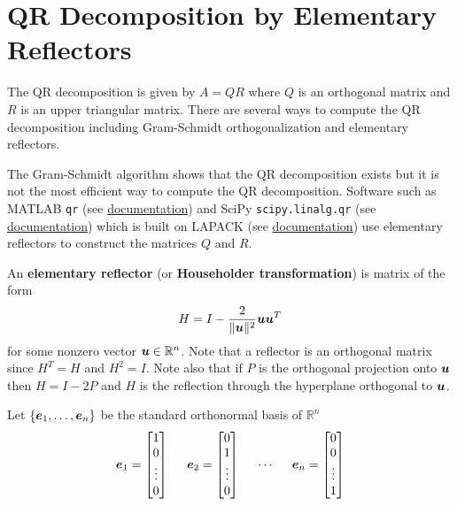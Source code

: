 \section{QR Decomposition by Elementary Reflectors}

\begin{bigidea}
The QR decomposition is given by $A = QR$ where $Q$ is an orthogonal matrix and $R$ is an upper triangular matrix. There are several ways to compute the QR decomposition including Gram-Schmidt orthogonalization and elementary reflectors.
\end{bigidea}

\begin{note}
The Gram-Schmidt algorithm shows that the QR decomposition exists but it is not the most efficient way to compute the QR decomposition. Software such as MATLAB {\tt qr} (see \href{https://www.mathworks.com/help/matlab/ref/qr.html}{documentation}) and SciPy {\tt scipy.linalg.qr} (see \href{https://docs.scipy.org/doc/scipy/reference/generated/scipy.linalg.qr.html}{documentation}) which is built on LAPACK (see \href{https://www.netlib.org/lapack/lug/node128.html#secorthog}{documentation}) use elementary reflectors to construct the matrices $Q$ and $R$.
\end{note}

\begin{definition}
An {\bf elementary reflector} (or {\bf Householder transformation}) \cite[p.120]{MH} is matrix of the form
$$
H = I - \frac{2}{\| \boldsymbol{u} \|^2} \boldsymbol{u} \boldsymbol{u}^T
$$
for some nonzero vector $\boldsymbol{u} \in \mathbb{R}^n$. Note that a reflector is an orthogonal matrix since $H^T = H$ and $H^2 = I$. Note also that if $P$ is the orthogonal projection onto $\boldsymbol{u}$ then $H = I - 2P$ and $H$ is the reflection through the hyperplane orthogonal to $\boldsymbol{u}$.
\end{definition}

\begin{definition}
Let $\{ \boldsymbol{e}_1, \dots, \boldsymbol{e}_n \}$ be the standard orthonormal basis of $\mathbb{R}^n$
$$
\boldsymbol{e}_1 = \begin{bmatrix} 1 \\ 0 \\ \vdots \\ 0 \end{bmatrix}
\hspace{5mm}
\boldsymbol{e}_2 = \begin{bmatrix} 0 \\ 1 \\ \vdots \\ 0 \end{bmatrix}
\hspace{5mm}
\cdots
\hspace{5mm}
\boldsymbol{e}_n = \begin{bmatrix} 0 \\ 0 \\ \vdots \\ 1 \end{bmatrix}
$$
\end{definition}


